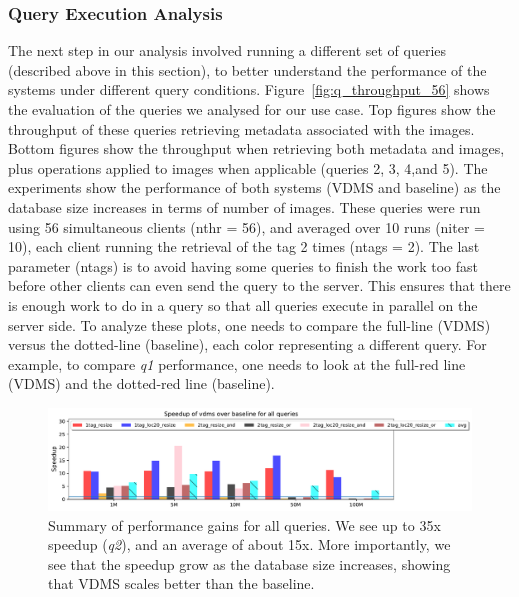 


\subsubsection{Query Execution Analysis}

The next step in our analysis involved running a different set of queries
(described above in this section),
to better understand the performance of the systems under different query conditions.
Figure~\ref{fig:q_throughput_56} shows the evaluation of the
queries we analysed for our use case.
Top figures show the throughput of these queries
retrieving metadata associated with the images.
Bottom figures show the throughput when retrieving both metadata and images,
plus operations applied to images when applicable (queries 2, 3, 4,and 5).
The experiments show the performance of both systems (VDMS and baseline) as the
database size increases in terms of number of images.
These queries were run using 56 simultaneous clients (nthr = 56),
and averaged over 10 runs (niter = 10),
each client running the retrieval of the tag 2 times (ntags = 2).
The last parameter (ntags) is to avoid having some queries to finish the work
too fast before other clients can even send the query to the server.
This ensures that there is enough work to do in a query so that
all queries execute in parallel on the server side.
To analyze these plots, one needs to compare the full-line (VDMS) versus the
dotted-line (baseline), each color representing a different query.
For example, to compare \textit{q1} performance, one needs to look at
the full-red line (VDMS) and the dotted-red line (baseline).

\begin{figure}[ht!]
\centering
\includegraphics[width=\textwidth]{figures/plot_56_query_times_speedup}
\caption{Summary of performance gains for all queries.
We see up to 35x speedup (\textit{q2}), and an average of about 15x.
More importantly, we see that the speedup grow as the database size increases,
showing that VDMS scales better than the baseline.}
\label{fig:summary_images}
\end{figure}

